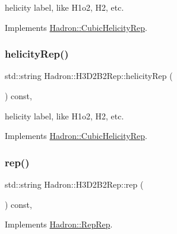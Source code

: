 helicity label, like H1o2, H2, etc. 

Implements \mbox{\hyperlink{structHadron_1_1CubicHelicityRep_af1096946b7470edf0a55451cc662f231}{Hadron\+::\+Cubic\+Helicity\+Rep}}.

\mbox{\label{structHadron_1_1H3D2B2Rep_a3e941d14c5dea81e231504962222c3c5}} 
\subsubsection{\texorpdfstring{helicityRep()}{helicityRep()}\hspace{0.1cm}{\footnotesize\ttfamily [2/2]}}
{\footnotesize\ttfamily std\+::string Hadron\+::\+H3\+D2\+B2\+Rep\+::helicity\+Rep (\begin{DoxyParamCaption}{ }\end{DoxyParamCaption}) const\hspace{0.3cm}{\ttfamily [inline]}, {\ttfamily [virtual]}}

helicity label, like H1o2, H2, etc. 

Implements \mbox{\hyperlink{structHadron_1_1CubicHelicityRep_af1096946b7470edf0a55451cc662f231}{Hadron\+::\+Cubic\+Helicity\+Rep}}.

\mbox{\label{structHadron_1_1H3D2B2Rep_af5ed865d7a3f08904144cb23f152ecb5}} 
\subsubsection{\texorpdfstring{rep()}{rep()}\hspace{0.1cm}{\footnotesize\ttfamily [1/3]}}
{\footnotesize\ttfamily std\+::string Hadron\+::\+H3\+D2\+B2\+Rep\+::rep (\begin{DoxyParamCaption}{ }\end{DoxyParamCaption}) const\hspace{0.3cm}{\ttfamily [inline]}, {\ttfamily [virtual]}}



Implements \mbox{\hyperlink{structHadron_1_1RepRep_ab3213025f6de249f7095892109575fde}{Hadron\+::\+Rep\+Rep}}.

\mbox{\label{structHadron_1_1H3D2B2Rep_af5ed865d7a3f08904144cb23f152ecb5}} 
